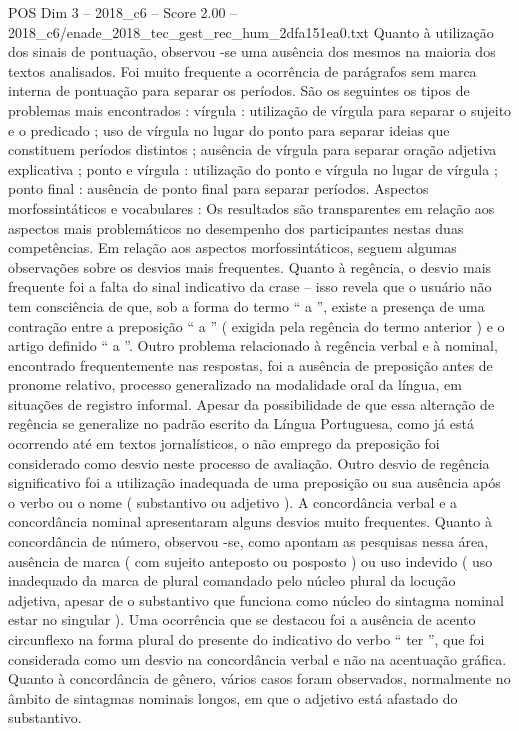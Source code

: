\begin{textsample}{POS Dim 3 – 2018\_c6 – Score 2.00 – 2018\_c6/enade\_2018\_tec\_gest\_rec\_hum\_2dfa151ea0.txt}
Quanto à utilização dos sinais de pontuação, observou -se uma ausência dos mesmos na maioria dos textos analisados.
Foi muito frequente a ocorrência de parágrafos sem marca interna de pontuação para separar os períodos.
São os seguintes os tipos de problemas mais encontrados : vírgula : utilização de vírgula para separar o sujeito e o predicado ; uso de vírgula no lugar do ponto para separar ideias que constituem períodos distintos ; ausência de vírgula para separar oração adjetiva explicativa ; ponto e vírgula : utilização do ponto e vírgula no lugar de vírgula ; ponto final : ausência de ponto final para separar períodos.
Aspectos morfossintáticos e vocabulares : Os resultados são transparentes em relação aos aspectos mais problemáticos no desempenho dos participantes nestas duas competências.
Em relação aos aspectos morfossintáticos, seguem algumas observações sobre os desvios mais frequentes.
Quanto à regência, o desvio mais frequente foi a falta do sinal indicativo da crase – isso revela que o usuário não tem consciência de que, sob a forma do termo “ a ”, existe a presença de uma contração entre a preposição “ a ” ( exigida pela regência do termo anterior ) e o artigo definido “ a ”.
Outro problema relacionado à regência verbal e à nominal, encontrado frequentemente nas respostas, foi a ausência de preposição antes de pronome relativo, processo generalizado na modalidade oral da língua, em situações de registro informal.
Apesar da possibilidade de que essa alteração de regência se generalize no padrão escrito da Língua Portuguesa, como já está ocorrendo até em textos jornalísticos, o não emprego da preposição foi considerado como desvio neste processo de avaliação.
Outro desvio de regência significativo foi a utilização inadequada de uma preposição ou sua ausência após o verbo ou o nome ( substantivo ou adjetivo ).
A concordância verbal e a concordância nominal apresentaram alguns desvios muito frequentes.
Quanto à concordância de número, observou -se, como apontam as pesquisas nessa área, ausência de marca ( com sujeito anteposto ou posposto ) ou uso indevido ( uso inadequado da marca de plural comandado pelo núcleo plural da locução adjetiva, apesar de o substantivo que funciona como núcleo do sintagma nominal estar no singular ).
Uma ocorrência que se destacou foi a ausência de acento circunflexo na forma plural do presente do indicativo do verbo “ ter ”, que foi considerada como um desvio na concordância verbal e não na acentuação gráfica.
Quanto à concordância de gênero, vários casos foram observados, normalmente no âmbito de sintagmas nominais longos, em que o adjetivo está afastado do substantivo.

\end{textsample}
